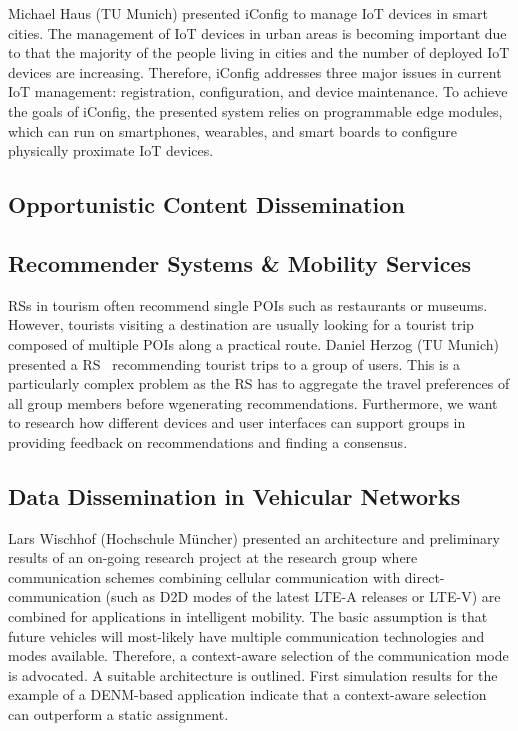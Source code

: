 Michael Haus (TU Munich) presented iConfig to manage \ac{IoT} devices in smart
cities. The management of \ac{IoT} devices in urban areas is becoming
important due to that the majority of the people living in cities and the
number of deployed \ac{IoT} devices are increasing. Therefore, iConfig
addresses three major issues in current \ac{IoT} management: registration,
configuration, and device maintenance. To achieve the goals of iConfig, the
presented system relies on programmable edge modules, which can run on
smartphones, wearables, and smart boards to configure physically proximate
\ac{IoT} devices.


\subsection{Opportunistic Content Dissemination}


\subsection{Recommender Systems \& Mobility Services}

\ac{RSs} in tourism often recommend single \ac{POIs} such as restaurants or
museums. However, tourists visiting a destination are usually looking for a
tourist trip composed of multiple \ac{POIs} along a practical route. Daniel
Herzog (TU Munich) presented a \ac{RS}~\cite{dherzog:it:2017} recommending
tourist trips to a group of users.  This is a particularly complex problem as
the \ac{RS} has to aggregate the travel preferences of all group members
before wgenerating recommendations.  Furthermore, we want to research how
different devices and user interfaces can support groups in providing feedback
on recommendations and finding a consensus.

\subsection{Data Dissemination in Vehicular Networks}

Lars Wischhof (Hochschule Müncher) presented an architecture and preliminary
results of an on-going research project at the research group where
communication schemes combining cellular communication with
direct-communication (such as \ac{D2D} modes of the latest LTE-A releases or
LTE-V) are combined for applications in intelligent mobility. The basic
assumption is that future vehicles will most-likely have multiple
communication technologies and modes available. Therefore, a context-aware
selection of the communication mode is advocated. A suitable architecture is
outlined. First simulation results for the example of a DENM-based application
indicate that a context-aware selection can outperform a static assignment.


